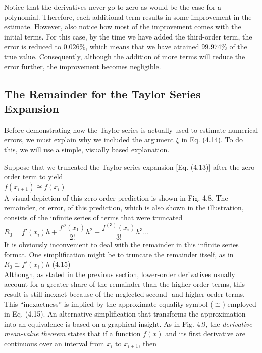 \documentclass[../main.tex]{subfiles}
\begin{document}
\begin{example}
    Notice that the derivatives never go to zero as would be the case for a polynomial.
    Therefore, each additional term results in some improvement in the estimate. However,
    also notice how most of the improvement comes with the initial terms. For this case, by the
    time we have added the third-order term, the error is reduced to $0.026\%$, which means that
    we have attained $99.974\%$ of the true value. Consequently, although the addition of more
    terms will reduce the error further, the improvement becomes negligible.\\
\end{example}

\subsection{The Remainder for the Taylor Series Expansion}
\noindent
Before demonstrating how the Taylor series is actually used to estimate numerical errors,
we must explain why we included the argument $\xi$ in Eq. (4.14). To do this, we will use a
simple, visually based explanation.

\noindent
Suppose that we truncated the Taylor series expansion [Eq. (4.13)] after the zero-order
term to yield\\

$f(x_{i+1})\cong f(x_i)$\\

\noindent
A visual depiction of this zero-order prediction is shown in Fig. 4.8. The remainder, or
error, of this prediction, which is also shown in the illustration, consists of the infinite
series of terms that were truncated\\

$R_0 = f'(x_i)h + \dfrac{f''(x_1)}{2!}h^2 + \dfrac{f^{(3)}(x_i)}{3!}h^3\hdots$\\

\noindent
It is obviously inconvenient to deal with the remainder in this infinite series format. One
simplification might be to truncate the remainder itself, as in\\

$R_0\cong f'(x_i)h$
\hfill
(4.15)\\

\noindent
Although, as stated in the previous section, lower-order derivatives usually account for a
greater share of the remainder than the higher-order terms, this result is still inexact because
of the neglected second- and higher-order terms. This  ``inexactness'' is implied by the
approximate equality symbol ($\cong$) employed in Eq. (4.15).
An alternative simplification that transforms the approximation into an equivalence is
based on a graphical insight. As in Fig. 4.9, the \emph{derivative mean-value theorem} states that
if a function $f (x)$ and its first derivative are continuous over an interval from $x_i$ to $x_{i+1}$, then\\
\end{document}
